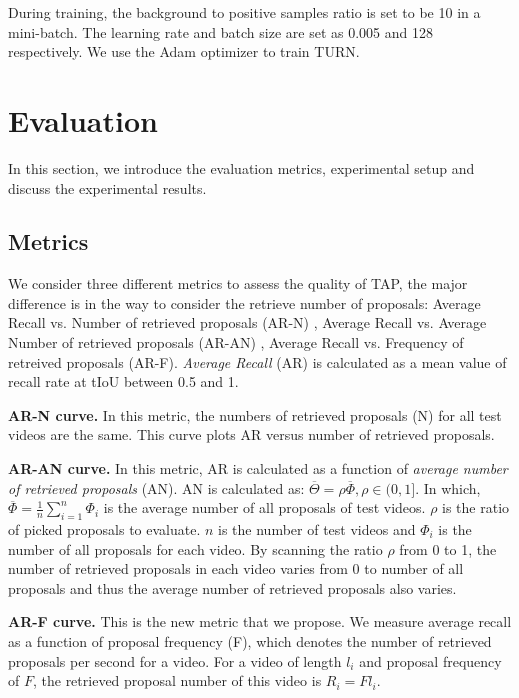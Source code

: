 \documentclass[10pt,twocolumn,letterpaper]{article}
\begin{document}
During training, the background to positive samples ratio is set to be 10 in a mini-batch. The learning rate and batch size are set as 0.005 and 128 respectively. We use the Adam \cite{kingma2014adam} optimizer to train TURN.

\section{Evaluation}
In this section, we introduce the evaluation metrics, experimental setup and discuss the experimental results.

\subsection{Metrics}

  We consider three different metrics to assess the quality of TAP, the major difference is in the way to consider the retrieve number of proposals: Average Recall vs. Number of retrieved proposals (AR-N) \cite{yu2015fast,hosang2016makes}, Average Recall vs. Average Number of retrieved proposals (AR-AN) \cite{escorcia2016daps}, Average Recall vs. Frequency of retreived proposals (AR-F). \textit{Average Recall} (AR) is calculated as a mean value of recall rate at tIoU between 0.5 and 1.

 \textbf{AR-N curve.} In this metric, the numbers of retrieved proposals (N) for all test videos are the same. This curve plots AR versus number of retrieved proposals. 
 
 \textbf{AR-AN curve.} In this metric, AR is calculated as a function of \textit{average number of retrieved proposals} (AN).  AN is calculated as:
    $\overline{\Theta} = \rho\overline{\Phi},  \rho\in(0,1]$. In which, $\overline{\Phi} = \frac{1}{n}\sum_{i=1}^{n} \Phi_i$ is the average number of all proposals of test videos. $\rho$ is the ratio of picked proposals to evaluate. $n$ is the number of test videos and $\Phi_i$ is the number of all proposals for each video. By scanning the ratio $\rho$ from 0 to 1, the number of retrieved proposals in each video varies from 0 to number of all proposals and thus the average number of retrieved proposals also varies.
 
 \textbf{AR-F curve.} This is the new metric that we propose. We measure average recall as a function of proposal frequency (F), which denotes the number of retrieved proposals per second for a video. For a video of length $l_i$ and proposal frequency of $F$, the retrieved proposal number of this video is $R_i = Fl_i$.
 
\end{document}
